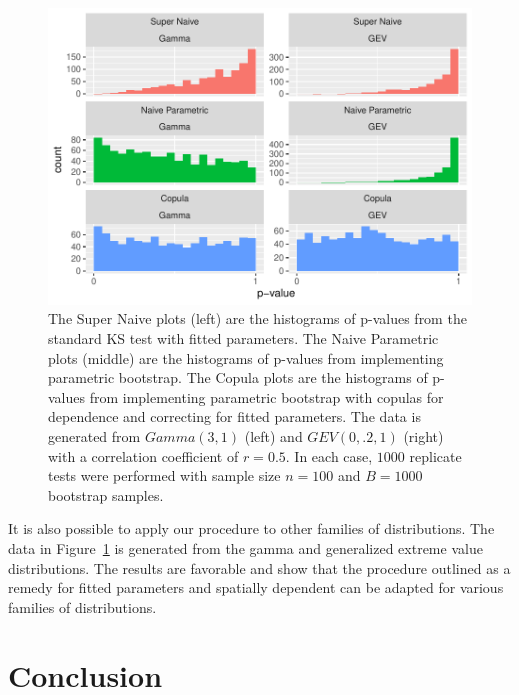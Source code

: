 \documentclass[12pt, letterpaper, titlepage]{article}
\begin{document}
\begin{figure}[tbp]
  \centering
  \includegraphics[width=\textwidth]{hist_gamma_gev_FD}
  \caption{The Super Naive plots (left) are the histograms of p-values from the 
  standard KS test with fitted parameters. The Naive Parametric plots (middle) 
  are the histograms of p-values from implementing parametric bootstrap. The 
  Copula plots are the histograms of p-values from implementing parametric 
  bootstrap with copulas for dependence and correcting for fitted parameters. 
  The data is generated from $Gamma(3, 1)$ (left) and $GEV(0, .2, 1)$ (right) 
  with a correlation coefficient of $r = 0.5$. In each case, $1000$ replicate 
  tests were performed with sample size $n = 100$ and $B = 1000$ bootstrap 
  samples.}
  \label{fig:hist_gamma_gev_FD}
\end{figure}

It is also possible to apply our procedure to other families of distributions. 
The data in Figure~\ref{fig:hist_gamma_gev_FD} is generated from the gamma and 
generalized extreme value distributions. The results are favorable and show that 
the procedure outlined as a remedy for fitted parameters and spatially dependent 
can be adapted for various families of distributions.


\section{Conclusion}
\label{sec:conclusion}
\end{document}
